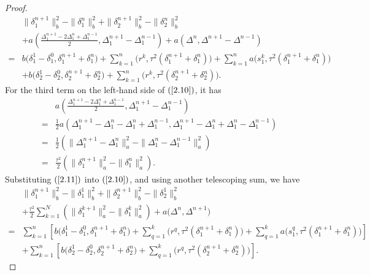 \documentclass[preprint,12pt]{elsarticle}
\begin{document}
\begin{proof}
\begin{equation}\label{2.10}
\begin{aligned}
     &\|\delta_1^{n+1}\|_b^2-\|\delta_1^{n}\|_b^2+\|\delta_2^{n+1}\|_b^2-\|\delta_2^{n}\|_b^2\\
     &+a\left(\frac{\Delta_1^{n+1}-2\Delta_1^{n}+\Delta_1^{n-1}}{2},\Delta_1^{n+1}-\Delta_1^{n-1}\right)
     +a(\Delta^{n},\Delta^{n+1}-\Delta^{n-1})\\
     =&b\big(\delta_1^1-\delta_1^0,\delta_1^{n+1}+\delta_1^{n}\big)+\sum_{k=1}^n\big(r^k,\tau^2(\delta_1^{n+1}+\delta_1^{n})\big)+\sum_{k=1}^na\big(s_1^k,\tau^2(\delta_1^{n+1}+\delta_1^{n})\big)\\
     &+b\big(\delta_2^1-\delta_2^0,\delta_2^{n+1}+\delta_2^{n}\big)+\sum_{k=1}^n\big(r^k,\tau^2(\delta_2^{n+1}+\delta_2^{n})\big).
\end{aligned}
\end{equation}
For the third term on the left-hand side of $(\ref{2.10})$, it has
\begin{equation}\label{2.11}
\begin{aligned}
     &a\left(\frac{\Delta_1^{n+1}-2\Delta_1^{n}+\Delta_1^{n-1}}{2},\Delta_1^{n+1}-\Delta_1^{n-1}\right)\\
     =&\frac{1}{2}a\left(\Delta_1^{n+1}-\Delta_1^{n}-\Delta_1^{n}+\Delta_1^{n-1},\Delta_1^{n+1}-\Delta_1^{n}+\Delta_1^{n}-\Delta_1^{n-1}\right)\\
     =&\frac{1}{2}\left(\|\Delta_1^{n+1}-\Delta_1^{n}\|_a^2-\|\Delta_1^{n}-\Delta_1^{n-1}\|_a^2\right)\\
     =&\frac{\tau^2}{2}\left(\|\delta_1^{n+1}\|_a^2-\|\delta_1^{n}\|_a^2\right).
\end{aligned}
\end{equation}
Substituting $(\ref{2.11})$ into $(\ref{2.10})$, and using another telescoping sum, we have
\begin{equation}\label{2.12}
\begin{aligned}
     &\|\delta_1^{n+1}\|_b^2-\|\delta_1^{1}\|_b^2+\|\delta_2^{n+1}\|_b^2-\|\delta_2^{1}\|_b^2\\
     &+\frac{\tau^2}{2}\sum_{k=1}^N\left(\|\delta_1^{k+1}\|_a^2-\|\delta_1^{k}\|_a^2\right)
     +a\big(\Delta^{n},\Delta^{n+1}\big)\\
     =&\sum_{k=1}^n\left[b\big(\delta_1^1-\delta_1^0,\delta_1^{n+1}+\delta_1^{n}\big)+\sum_{q=1}^k\big(r^q,\tau^2(\delta_1^{n+1}+\delta_1^{n})\big)+\sum_{q=1}^ka\big(s_1^q,\tau^2(\delta_1^{n+1}+\delta_1^{n})\big)\right]\\
     &+\sum_{k=1}^n\left[b\big(\delta_2^1-\delta_2^0,\delta_2^{n+1}+\delta_2^{n}\big)+\sum_{q=1}^k\big(r^q,\tau^2(\delta_2^{n+1}+\delta_2^{n})\big)\right].

\end{aligned}
\end{equation}
\end{proof}
\end{document}
